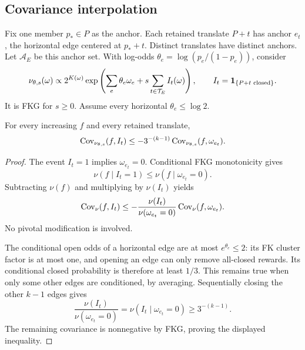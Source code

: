 \subsection{Covariance interpolation}

Fix one member \(p_*\in P\) as the anchor. Each retained translate \(P+t\) has anchor \(e_t\), the horizontal edge centered at \(p_*+t\). Distinct translates have distinct anchors. Let \(\mathcal A_E\) be this anchor set. With log-odds \(\theta_e=\log(p_e/(1-p_e))\), consider
\begin{equation}
 \nu_{\theta,s}(\omega)\propto
 2^{K(\omega)}
 \exp\left(\sum_e\theta_e\omega_e+
       s\sum_{t\in\mathcal T_E}I_t(\omega)\right),
 \qquad I_t=\mathbf 1_{\{P+t\text{ closed}\}}.
 \label{eq:interpolation-family}
\end{equation}
It is FKG for \(s\ge0\). Assume every horizontal \(\theta_e\le\log2\).

\begin{lemma}\label{lem:covariance}
For every increasing \(f\) and every retained translate,
\begin{equation}
 \operatorname{Cov}_{\nu_{\theta,s}}(f,I_t)
 \le -3^{-(k-1)}
       \operatorname{Cov}_{\nu_{\theta,s}}(f,\omega_{e_t}).
 \label{eq:covariance}
\end{equation}
\end{lemma}
\begin{proof}
The event \(I_t=1\) implies \(\omega_{e_t}=0\). Conditional FKG monotonicity gives
\begin{equation}
 \nu(f\mid I_t=1)\le\nu(f\mid\omega_{e_t}=0).
\end{equation}
Subtracting \(\nu(f)\) and multiplying by \(\nu(I_t)\) yields
\begin{equation}
 \operatorname{Cov}_\nu(f,I_t)
 \le-\frac{\nu(I_t)}{\nu(\omega_{e_t}=0)}
       \operatorname{Cov}_\nu(f,\omega_{e_t}).
\end{equation}
No pivotal modification is involved.

The conditional open odds of a horizontal edge are at most \(e^{\theta_e}\le2\): its FK cluster factor is at most one, and opening an edge can only remove all-closed rewards. Its conditional closed probability is therefore at least \(1/3\). This remains true when only some other edges are conditioned, by averaging. Sequentially closing the other \(k-1\) edges gives
\begin{equation}
 \frac{\nu(I_t)}{\nu(\omega_{e_t}=0)}
 =\nu(I_t\mid\omega_{e_t}=0)\ge3^{-(k-1)}.
\end{equation}
The remaining covariance is nonnegative by FKG, proving the displayed inequality.
\end{proof}

